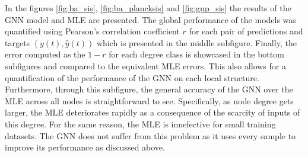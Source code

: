 In the figures \ref{fig:ba_sis}, \ref{fig:ba_plancksis} and \ref{fig:gnp_sis}
the results of the GNN model and MLE are presented. The global performance
of the models was quantified using Pearson's correlation coefficient $r$ for each
pair of predictions and targets $(y(t), \hat{y}(t))$ which is presented in the middle
subfigure. Finally, the error computed as the $1-r$ for each degree
class is showcased in the bottom subfigures and compared to the
equivalent MLE errors. This also allows for a quantification of the
performance of the GNN on each local structure. Furthermore, through this
subfigure, the general accuracy of the GNN over the MLE across all nodes
is straightforward to see. Specifically, as node degree gets larger, the
MLE deteriorates rapidly as a consequence of the scarcity of inputs
of this degree. For the same reason, the MLE is innefective for small
training datasets. The GNN does not suffer from this problem as it uses
every sample to improve its performance as discussed above.
